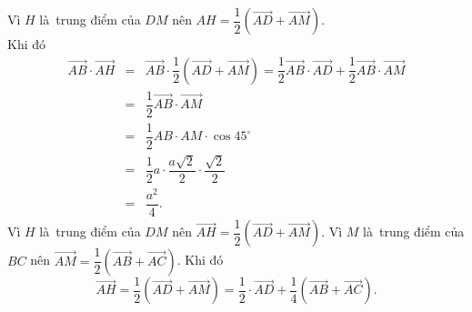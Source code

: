 \begin{ex}
{\begin{itemchoice}
			Vì $H$ là~trung điểm của $DM$ nên  $AH = \dfrac{1}{2} (\overrightarrow{AD} + \overrightarrow{AM})$.\\
			Khi đó 
			\begin{eqnarray*}
				\overrightarrow{AB}  \cdot \overrightarrow{AH} &=&\overrightarrow{AB} \cdot \dfrac{1}{2} (\overrightarrow{AD} + \overrightarrow{AM})=\dfrac{1}{2}\overrightarrow{AB}\cdot \overrightarrow{AD}+\dfrac{1}{2}\overrightarrow{AB}\cdot \overrightarrow{AM}\\
				&=& 
				 \dfrac{1}{2}\overrightarrow{AB}\cdot \overrightarrow{AM}\\
				 &=&\dfrac{1}{2} AB \cdot AM \cdot \cos 45^\circ\\
				 &=&\dfrac{1}{2} a \cdot \dfrac{a \sqrt{2}}{2} \cdot \dfrac{\sqrt{2}}{2}\\
				&=& \dfrac{a^2}{4}. 
			\end{eqnarray*}
			\itemch 
			 Vì $H$ là~trung điểm của $DM$ nên $ \overrightarrow{AH} = \dfrac{1}{2} (\overrightarrow{AD} + \overrightarrow{AM})$.
			Vì $M$  là~trung điểm của $BC$ nên $ \overrightarrow{AM} = \dfrac{1}{2} (\overrightarrow{AB} + \overrightarrow{AC})$.
			Khi đó 
			\[ 
			\overrightarrow{AH} =  \dfrac{1}{2}\left(\overrightarrow{AD} + \overrightarrow{AM}\right) = \dfrac{1}{2}\cdot \overrightarrow{AD} + \dfrac{1}{4}\left(\overrightarrow{AB} + \overrightarrow{AC}\right).
			 \]
		\end{itemchoice}
	} 
\end{ex}

